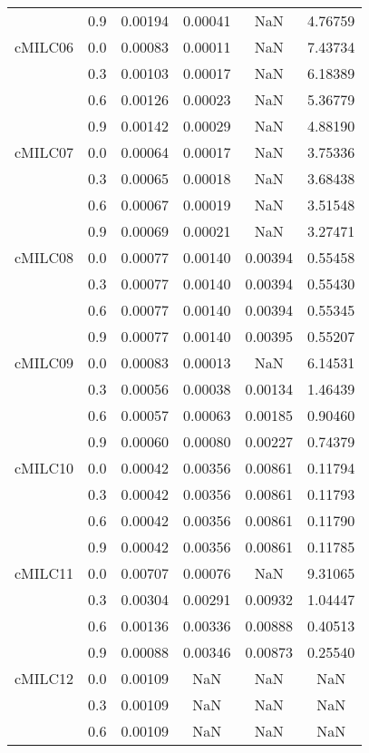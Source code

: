 \begin{longtable}{cccccc}
        & 0.9 & 0.00194 & 0.00041 & NaN & 4.76759 \\
cMILC06 & 0.0 & 0.00083 & 0.00011 & NaN & 7.43734 \\
        & 0.3 & 0.00103 & 0.00017 & NaN & 6.18389 \\
        & 0.6 & 0.00126 & 0.00023 & NaN & 5.36779 \\
        & 0.9 & 0.00142 & 0.00029 & NaN & 4.88190 \\
cMILC07 & 0.0 & 0.00064 & 0.00017 & NaN & 3.75336 \\
        & 0.3 & 0.00065 & 0.00018 & NaN & 3.68438 \\
        & 0.6 & 0.00067 & 0.00019 & NaN & 3.51548 \\
        & 0.9 & 0.00069 & 0.00021 & NaN & 3.27471 \\
cMILC08 & 0.0 & 0.00077 & 0.00140 & 0.00394 & 0.55458 \\
        & 0.3 & 0.00077 & 0.00140 & 0.00394 & 0.55430 \\
        & 0.6 & 0.00077 & 0.00140 & 0.00394 & 0.55345 \\
        & 0.9 & 0.00077 & 0.00140 & 0.00395 & 0.55207 \\
cMILC09 & 0.0 & 0.00083 & 0.00013 & NaN & 6.14531 \\
        & 0.3 & 0.00056 & 0.00038 & 0.00134 & 1.46439 \\
        & 0.6 & 0.00057 & 0.00063 & 0.00185 & 0.90460 \\
        & 0.9 & 0.00060 & 0.00080 & 0.00227 & 0.74379 \\
cMILC10 & 0.0 & 0.00042 & 0.00356 & 0.00861 & 0.11794 \\
        & 0.3 & 0.00042 & 0.00356 & 0.00861 & 0.11793 \\
        & 0.6 & 0.00042 & 0.00356 & 0.00861 & 0.11790 \\
        & 0.9 & 0.00042 & 0.00356 & 0.00861 & 0.11785 \\
cMILC11 & 0.0 & 0.00707 & 0.00076 & NaN & 9.31065 \\
        & 0.3 & 0.00304 & 0.00291 & 0.00932 & 1.04447 \\
        & 0.6 & 0.00136 & 0.00336 & 0.00888 & 0.40513 \\
        & 0.9 & 0.00088 & 0.00346 & 0.00873 & 0.25540 \\
cMILC12 & 0.0 & 0.00109 & NaN & NaN & NaN \\
        & 0.3 & 0.00109 & NaN & NaN & NaN \\
        & 0.6 & 0.00109 & NaN & NaN & NaN \\

\end{longtable}
